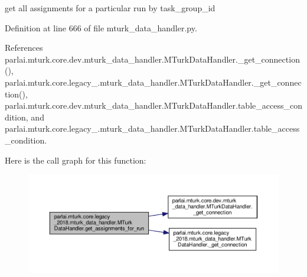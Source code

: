 \begin{DoxyVerb}get all assignments for a particular run by task_group_id\end{DoxyVerb}
 

Definition at line 666 of file mturk\+\_\+data\+\_\+handler.\+py.



References parlai.\+mturk.\+core.\+dev.\+mturk\+\_\+data\+\_\+handler.\+M\+Turk\+Data\+Handler.\+\_\+get\+\_\+connection(), parlai.\+mturk.\+core.\+legacy\+\_.\+mturk\+\_\+data\+\_\+handler.\+M\+Turk\+Data\+Handler.\+\_\+get\+\_\+connection(), parlai.\+mturk.\+core.\+dev.\+mturk\+\_\+data\+\_\+handler.\+M\+Turk\+Data\+Handler.\+table\+\_\+access\+\_\+condition, and parlai.\+mturk.\+core.\+legacy\+\_.\+mturk\+\_\+data\+\_\+handler.\+M\+Turk\+Data\+Handler.\+table\+\_\+access\+\_\+condition.

Here is the call graph for this function\+:
\nopagebreak
\begin{figure}[H]
\begin{center}
\leavevmode
\includegraphics[width=350pt]{classparlai_1_1mturk_1_1core_1_1legacy__2018_1_1mturk__data__handler_1_1MTurkDataHandler_a4a1d5f9b4aed51ba98d4979317ef9329_cgraph}
\end{center}
\end{figure}
\mbox{\label{classparlai_1_1mturk_1_1core_1_1legacy__2018_1_1mturk__data__handler_1_1MTurkDataHandler_a0726a2a5d8840cde079523917ee0706d}} 
